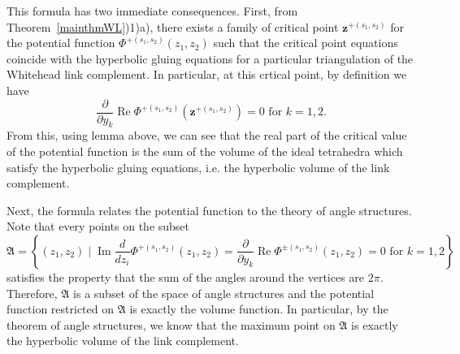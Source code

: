 \documentclass[10pt,a4paper]{article}
\newcommand{\lt}{\left}
\newcommand{\rt}{\right}
\def \Re{\operatorname{Re}}
\def \Re{\operatorname{Re}}
\def \im{\operatorname{Im}}
\def \im{\operatorname{Im}}
\begin{document}
This formula has two immediate consequences. First, from Theorem~\ref{mainthmWL})1)a), there exists a family of critical point $\mathbf{z}^{+(s_1,s_2)}$ for the potential function $ \Phi^{+(s_1,s_2)}(z_1,z_2) $ such that the critical point equations coincide with the hyperbolic gluing equations for a particular triangulation of the Whitehead link complement. In particular, at this crtical point, by definition we have 
$$  \frac{\partial}{\partial y_k} \Re \Phi^{+(s_1,s_2)}(\mathbf{z}^{+(s_1,s_2)}) = 0
 \text{ for $k=1,2$.}$$
From this, using lemma above, we can see that the real part of the critical value of the potential function is the sum of the volume of the ideal tetrahedra which satisfy the hyperbolic gluing equations, i.e. the hyperbolic volume of the link complement. 

Next, the formula relates the potential function to the theory of angle structures. Note that every points on the subset 
$$\mathfrak{A} = \lt\{(z_1,z_2) \mid \im \frac{d}{dz_i} \Phi^{+(s_1,s_2)}(z_1,z_2) =  \frac{\partial}{\partial y_k} \Re \Phi^{\pm(s_1,s_2)}(z_1,z_2) = 0 \text{ for $k=1,2$}\rt\}$$ 
satisfies the property that the sum of the angles around the vertices are $2\pi$. Therefore,  $\mathfrak{A}$ is  a subset of the space of angle structures and the potential function restricted on $\mathfrak{A}$ is exactly the volume function. In particular, by the theorem of angle structures, we know that the maximum point on $\mathfrak{A}$ is exactly the hyperbolic volume of the link complement. 
\end{document}
